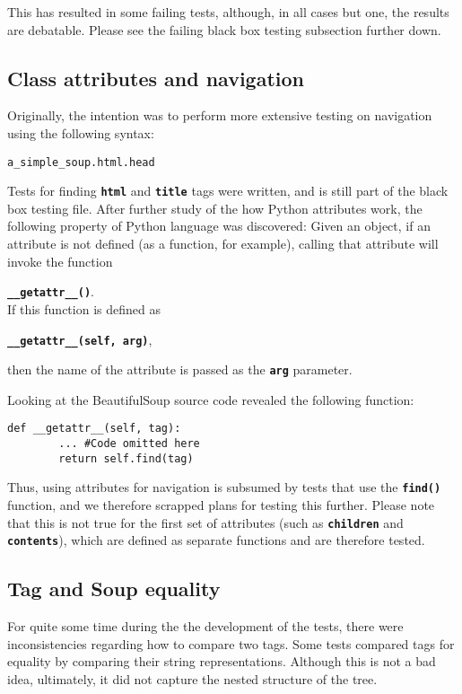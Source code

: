 \documentclass[10pt]{article}
\newcommand{\tbt}[1]{\texttt{\textbf{#1}}}
\begin{document}
This has resulted in some failing tests, although, in all cases but one, the results are debatable. Please see the failing black box testing subsection further down.

\subsection{Class attributes and navigation}

Originally, the intention was to perform more extensive testing on navigation using the following syntax:
\begin{lstlisting}[style = pythonstyle]
a_simple_soup.html.head
\end{lstlisting}
Tests for finding \tbt{html} and \tbt{title} tags were written, and is still part of the black box testing file. After further study of the how Python attributes work, the following property of Python language was discovered: Given an object, if an attribute is not defined (as a function, for example), calling that attribute will invoke the function 

\tbt{\_\_getattr\_\_()}. \\

If this function is defined as 

\tbt{\_\_getattr\_\_(self, arg)}, 

then the name of the attribute is passed as the \tbt{arg} parameter.

Looking at the BeautifulSoup source code revealed the following function:
\begin{lstlisting}[style=pythonstyle]
  def __getattr__(self, tag):
        ... #Code omitted here
        return self.find(tag)
\end{lstlisting}

Thus, using attributes for navigation is subsumed by tests that use the \tbt{find()} function, and we therefore scrapped plans for testing this further. Please note that this is not true for the first set of attributes (such as \tbt{children} and \tbt{contents}), which are defined as separate functions and are therefore tested.

\subsection{Tag and Soup equality}

For quite some time during the the development of the tests, there were inconsistencies regarding how to compare two tags. Some tests compared tags for equality by comparing their string representations. Although this is not a bad idea, ultimately, it did not capture the nested structure of the tree. \\
\end{document}
